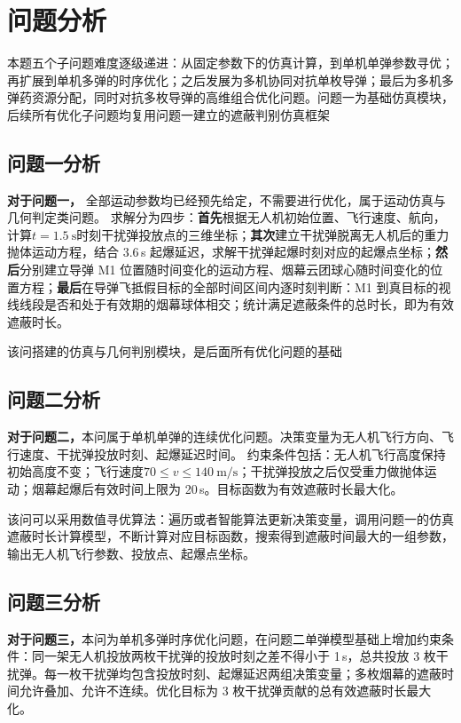 \documentclass[12pt,a4paper]{article}
\begin{document}
	
	\section{问题分析}
	本题五个子问题难度逐级递进：从固定参数下的仿真计算，到单机单弹参数寻优；再扩展到单机多弹的时序优化；之后发展为多机协同对抗单枚导弹；最后为多机多弹药资源分配，同时对抗多枚导弹的高维组合优化问题。问题一为基础仿真模块，后续所有优化子问题均复用问题一建立的遮蔽判别仿真框架
	\subsection{问题一分析}
	\textbf{对于问题一，}	全部运动参数均已经预先给定，不需要进行优化，属于运动仿真与几何判定类问题。
	求解分为四步：\textbf{首先}根据无人机初始位置、飞行速度、航向，计算\(t=1.5\ \text{s}\)时刻干扰弹投放点的三维坐标；\textbf{其次}建立干扰弹脱离无人机后的重力抛体运动方程，结合 3.6 s 起爆延迟，求解干扰弹起爆时刻对应的起爆点坐标；\textbf{然后}分别建立导弹 M1 位置随时间变化的运动方程、烟幕云团球心随时间变化的位置方程；\textbf{最后}在导弹飞抵假目标的全部时间区间内逐时刻判断：M1 到真目标的视线线段是否和处于有效期的烟幕球体相交；统计满足遮蔽条件的总时长，即为有效遮蔽时长。
	
	该问搭建的仿真与几何判别模块，是后面所有优化问题的基础
	
	
	\subsection{问题二分析}
	\textbf{对于问题二，}本问属于单机单弹的连续优化问题。决策变量为无人机飞行方向、飞行速度、干扰弹投放时刻、起爆延迟时间。
	约束条件包括：无人机飞行高度保持初始高度不变；飞行速度\(70\le v \le140\ \text{m/s}\)；干扰弹投放之后仅受重力做抛体运动；烟幕起爆后有效时间上限为 20 s。目标函数为有效遮蔽时长最大化。

	该问可以采用数值寻优算法：遍历或者智能算法更新决策变量，调用问题一的仿真遮蔽时长计算模型，不断计算对应目标函数，搜索得到遮蔽时间最大的一组参数，输出无人机飞行参数、投放点、起爆点坐标。
	
	\subsection{问题三分析}
	\textbf{对于问题三，}本问为单机多弹时序优化问题，在问题二单弹模型基础上增加约束条件：同一架无人机投放两枚干扰弹的投放时刻之差不得小于 1 s，总共投放 3 枚干扰弹。每一枚干扰弹均包含投放时刻、起爆延迟两组决策变量；多枚烟幕的遮蔽时间允许叠加、允许不连续。优化目标为 3 枚干扰弹贡献的总有效遮蔽时长最大化。
	
\end{document}
